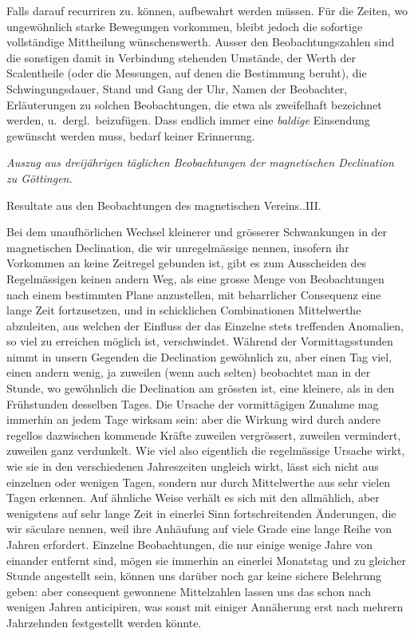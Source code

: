 Falls darauf recurriren zu. können, aufbewahrt werden müssen. Für die Zeiten, wo ungewöhnlich starke Bewegungen vorkommen, bleibt jedoch die sofortige vollständige Mittheilung wünschenswerth. Ausser den Beobachtungszahlen sind die sonstigen damit in Verbindung stehenden Umstände, der Werth der Scalentheile (oder die Messungen, auf denen die Bestimmung beruht), die Schwingungsdauer, Stand und Gang der Uhr, Namen der Beobachter, Erläuterungen zu solchen Beobachtungen, die etwa als zweifelhaft bezeichnet werden, u.\ dergl.\ beizufügen. Dass endlich immer eine \textit{baldige} Einsendung gewünscht werden muss, bedarf keiner Erinnerung.

\vspace{6mm}
\begin{center}\large\textit{Auszug aus dreijährigen täglichen Beobachtungen der magnetischen Declination zu Göttingen.}\end{center}
\begin{center}\small Resultate aus den Beobachtungen des magnetischen Vereins..\quad III.\end{center}

Bei dem unaufhörlichen Wechsel kleinerer und grösserer Schwankungen in der magnetischen Declination, die wir unregelmässige nennen, insofern ihr Vorkommen an keine Zeitregel gebunden ist, gibt es zum Ausscheiden des Regelmässigen keinen andern Weg, als eine grosse Menge von Beobachtungen nach einem bestimmten Plane anzustellen, mit beharrlicher Consequenz eine lange Zeit fortzusetzen, und in schicklichen Combinationen Mittelwerthe abzuleiten, aus welchen der Einfluss der das Einzelne stets treffenden Anomalien, so viel zu erreichen möglich ist, verschwindet. Während der Vormittagsstunden nimmt in unsern Gegenden die Declination gewöhnlich zu, aber einen Tag viel, einen andern wenig, ja zuweilen (wenn auch selten) beobachtet man in der Stunde, wo gewöhnlich die Declination am grössten ist, eine kleinere, als in den Frühstunden desselben Tages. Die Ursache der vormittägigen Zunahme mag immerhin an jedem Tage wirksam sein: aber die Wirkung wird durch andere regellos dazwischen kommende Kräfte zuweilen vergrössert, zuweilen vermindert, zuweilen ganz verdunkelt. Wie viel also eigentlich die regelmässige Ursache wirkt, wie sie in den verschiedenen Jahreszeiten ungleich wirkt, lässt sich nicht aus einzelnen oder wenigen Tagen, sondern nur durch Mittelwerthe aus sehr vielen Tagen
erkennen. Auf ähnliche Weise verhält es sich mit den allmählich, aber wenigstens auf sehr lange Zeit in einerlei Sinn fortschreitenden Änderungen, die wir säculare nennen, weil ihre Anhäufung auf viele Grade eine lange Reihe von Jahren erfordert. Einzelne Beobachtungen, die nur einige wenige Jahre von einander entfernt sind, mögen sie immerhin an einerlei Monatstag und zu gleicher Stunde angestellt sein, können uns darüber noch gar keine sichere Belehrung geben: aber consequent gewonnene Mittelzahlen lassen uns das schon nach wenigen Jahren anticipiren, was sonst mit einiger Annäherung erst nach mehrern Jahrzehnden festgestellt werden könnte.

